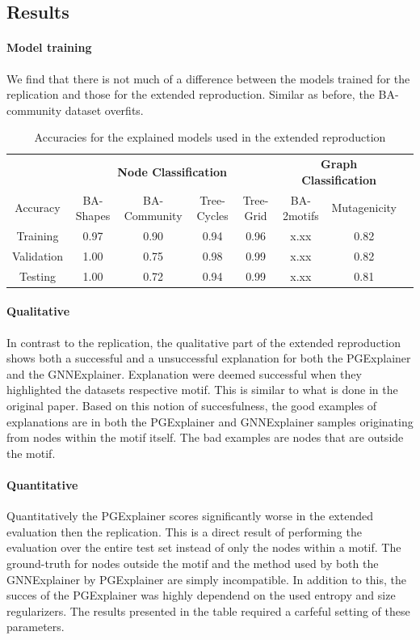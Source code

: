 \subsection{Results}
\paragraph{Model training}
We find that there is not much of a difference between the models trained for the replication and those for the extended reproduction. Similar as before, the BA-community dataset overfits. 
\begin{table}[]
\centering
\begin{tabular}{cccccccc}
\toprule
&\multicolumn{4}{c}{\textbf{Node Classification}} & \multicolumn{2}{c}{\textbf{Graph Classification}} \\
Accuracy & \multicolumn{1}{c}{BA-Shapes} & \multicolumn{1}{c}{BA-Community} & \multicolumn{1}{c}{Tree-Cycles} & \multicolumn{1}{c|}{Tree-Grid} & \multicolumn{1}{c}{BA-2motifs} & \multicolumn{1}{c}{Mutagenicity} \\ 
\midrule
Training & 0.97 & 0.90 & 0.94 & \multicolumn{1}{c|}{0.96} & x.xx & 0.82 \\
Validation & 1.00 & 0.75 & 0.98 & \multicolumn{1}{c|}{0.99} & x.xx & 0.82 \\
Testing & 1.00 & 0.72 & 0.94 & \multicolumn{1}{c|}{0.99} & x.xx & 0.81 \\
\bottomrule
\end{tabular}
\caption{Accuracies for the explained models used in the extended reproduction}
\label{tab:accuracies_gnn}
\end{table}

\paragraph{Qualitative}
In contrast to the replication, the qualitative part of the extended reproduction shows both a successful and a unsuccessful explanation for both the PGExplainer and the GNNExplainer. Explanation were deemed successful when they highlighted the datasets respective motif. This is similar to what is done in the original paper. Based on this notion of succesfulness, the good examples of explanations are in both the PGExplainer and GNNExplainer samples originating from nodes within the motif itself. The bad examples are nodes that are outside the motif. 

\paragraph{Quantitative}
Quantitatively the PGExplainer scores significantly worse in the extended evaluation then the replication. This is a direct result of performing the evaluation over the entire test set instead of only the nodes within a motif. The ground-truth for nodes outside the motif and the method used by both the GNNExplainer by PGExplainer are simply incompatible. In addition to this, the succes of the PGExplainer was highly dependend on the used entropy and size regularizers. The results presented in the table required a carfeful setting of these parameters. 

